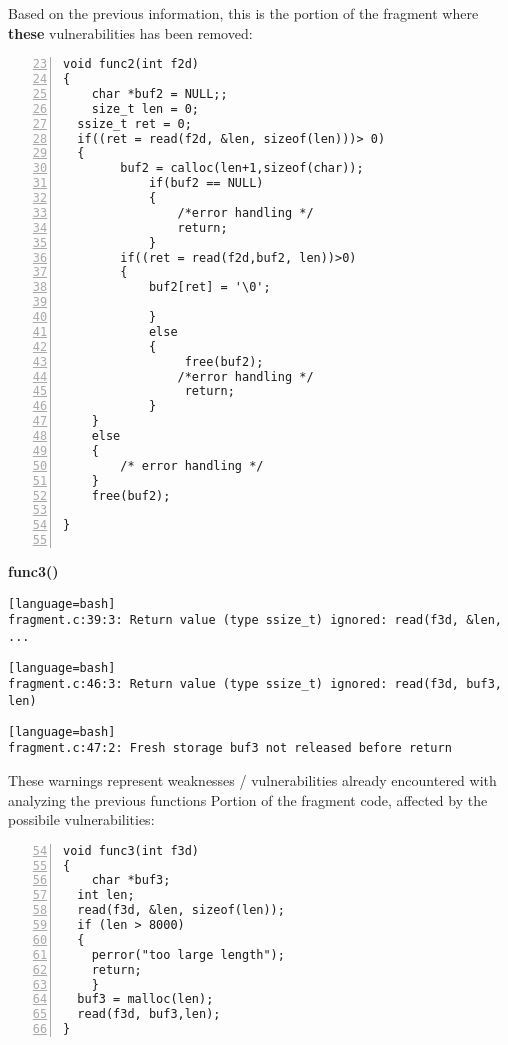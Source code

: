 \documentclass[a4paper,12pt]{article}
\begin{document}
\newpage
\noindent
Based on the previous information, this is the portion of the fragment where \textbf{these} vulnerabilities has been removed:
\begin{lstlisting}[style=c,numbers=left,firstnumber=23,linebackgroundcolor={
\ifnum\value{lstnumber}=28\color{green}\fi
\ifnum\value{lstnumber}=31\color{green}\fi
\ifnum\value{lstnumber}=36\color{green}\fi
\ifnum\value{lstnumber}=43\color{green}\fi
\ifnum\value{lstnumber}=52\color{green}\fi
}]
void func2(int f2d)
{
	char *buf2 = NULL;;
	size_t len = 0;
  ssize_t ret = 0;
  if((ret = read(f2d, &len, sizeof(len)))> 0)
  {
  		buf2 = calloc(len+1,sizeof(char));
			if(buf2 == NULL)
			{	
				/*error handling */
				return;
			} 
  		if((ret = read(f2d,buf2, len))>0)
  		{ 
  			buf2[ret] = '\0';
		  
			}
			else
			{
		 		 free(buf2);
		  		/*error handling */
		 		 return;
			}
	}
	else
	{
		/* error handling */
	}
	free(buf2);

}


\end{lstlisting}

\newpage
\noindent
\textbf{func3()}\\

   

\begin{lstlisting}[style=DOS][language=bash]
fragment.c:39:3: Return value (type ssize_t) ignored: read(f3d, &len, ...
\end{lstlisting}



\begin{lstlisting}[style=DOS][language=bash]
fragment.c:46:3: Return value (type ssize_t) ignored: read(f3d, buf3, len)
\end{lstlisting}


\begin{lstlisting}[style=DOS][language=bash]
fragment.c:47:2: Fresh storage buf3 not released before return
\end{lstlisting}
These warnings represent weaknesses / vulnerabilities already encountered with analyzing the previous functions
Portion of the fragment code, affected by the possibile vulnerabilities:
\begin{lstlisting}[style=c,numbers=left,firstnumber=54,linebackgroundcolor={
\ifnum\value{lstnumber}=58\color{red}\fi
\ifnum\value{lstnumber}=65\color{red}\fi
\ifnum\value{lstnumber}=66\color{red}\fi
}]
void func3(int f3d)
{
	char *buf3;
  int len;
  read(f3d, &len, sizeof(len));
  if (len > 8000) 
  { 
  	perror("too large length");
  	return; 
	}
  buf3 = malloc(len);
  read(f3d, buf3,len);        
}
\end{lstlisting}
\end{document}
